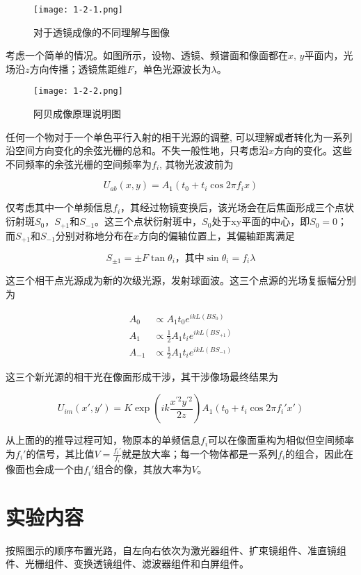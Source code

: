 \documentclass[12pt]{article}
\begin{document}
\begin{figure}[h!]
    \centering
    \texttt{[image: 1-2-1.png]}
    \caption{对于透镜成像的不同理解与图像}
\end{figure}

考虑一个简单的情况。如图所示，设物、透镜、频谱面和像面都在$x,\,y$平面内，光场沿$z$方向传播；透镜焦距维$F$，单色光源波长为$\lambda$。

\begin{figure}[htbp]
    \centering
    \texttt{[image: 1-2-2.png]}
    \caption{阿贝成像原理说明图}
\end{figure}

任何一个物对于一个单色平行入射的相干光源的调整, 可以理解或者转化为一系列沿空间方向变化的余弦光栅的总和。不失一般性地，只考虑沿$x$方向的变化。这些不同频率的余弦光栅的空间频率为$f_i$, 其物光波波前为

\[
    U_{ab}(x,y)=A_1(t_0 + t_i \cos 2\pi f_i x)
\]

仅考虑其中一个单频信息$f_i$，其经过物镜变换后，该光场会在后焦面形成三个点状衍射斑$S_0$，$S_{+1}$和$S_{-1}$。这三个点状衍射斑中，$S_0$处于xy平面的中心，即$S_0=0$；而$S_{+1}$和$S_{-1}$分别对称地分布在$x$方向的偏轴位置上，其偏轴距离满足

\[
    S_{\pm 1} = \pm F \tan\theta_i\text{，其中}\sin\theta_i = f_i\lambda
\]

这三个相干点光源成为新的次级光源，发射球面波。这三个点源的光场复振幅分别为

\[
    \begin{aligned}
        A_0 &\propto A_1t_0e^{ikL(BS_0)} \\
        A_1 &\propto \frac{1}{2}A_1t_ie^{ikL(BS_{+1})} \\
        A_{-1} &\propto \frac{1}{2}A_1t_ie^{ikL(BS_{-1})}
    \end{aligned}
\]

这三个新光源的相干光在像面形成干涉，其干涉像场最终结果为

\[
    U_{im}(x',y')=K\exp(ik\frac{x^{\prime 2}y^{\prime 2}}{2z})A_1(t_0 + t_i \cos 2\pi f_i'x')
\]

从上面的的推导过程可知，物原本的单频信息$f_i$可以在像面重构为相似但空间频率为$f_i'$的信号，其比值$V=\frac{f_i'}{f_i}$就是放大率；每一个物体都是一系列$f_i$的组合，因此在像面也会成一个由$f_i'$组合的像，其放大率为$V$。

\section{实验内容}
按照图示的顺序布置光路，自左向右依次为激光器组件、扩束镜组件、准直镜组件、光栅组件、变换透镜组件、滤波器组件和白屏组件。
\end{document}

